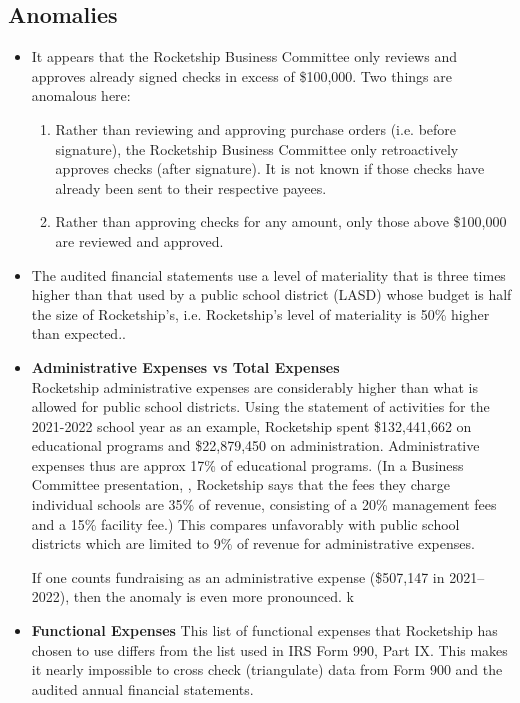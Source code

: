 \subsection{Anomalies}\indent%
\label{sec:anomalies}
\begin{itemize}
  \item It appears that the Rocketship Business Committee only reviews and approves already signed checks in excess of \$100,000. Two things are anomalous here:
  \begin{enumerate}
    \item Rather than reviewing and approving purchase orders (i.e. before signature), the Rocketship Business Committee only retroactively approves checks (after signature). It is not known if those checks have already been sent to their respective payees.
    \item Rather than approving checks for any amount, only those above \$100,000 are reviewed and approved.
  \end{enumerate}
  \item The audited financial statements use a level of materiality that is three times higher than that used by a public school district (LASD) whose budget is half the size of Rocketship's, i.e. Rocketship's level of materiality is 50\% higher than expected..

  \item \textbf{Administrative Expenses vs Total Expenses}\\

  Rocketship administrative expenses are considerably higher than what is allowed for public school districts. Using the statement of activities for the 2021-2022 school year as an example, Rocketship spent \$132,441,662 on educational programs and \$22,879,450 on administration.  Administrative expenses thus are approx 17\% of educational programs. (In a  Business Committee presentation, \textcite{Mukhopadhyay2013}, Rocketship says that the fees they charge individual schools are 35\% of revenue, consisting of a 20\% management fees and a 15\% facility fee.) This compares unfavorably with public school districts which are limited to 9\% of revenue for administrative expenses.

  If one counts fundraising as an administrative expense (\$507,147 in 2021–2022), then the anomaly is even more pronounced.
k  \item \textbf{Functional Expenses} This list of functional expenses that Rocketship has chosen to use differs from the list used in IRS Form 990, Part IX. This makes it nearly impossible to cross check (triangulate) data from Form 900 and the audited annual financial statements.
\end{itemize}

